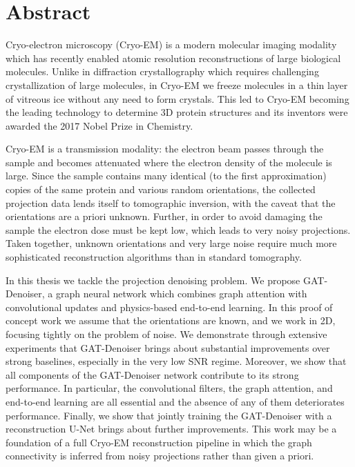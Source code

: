 \chapter{Abstract}


Cryo-electron microscopy (Cryo-EM) is a modern molecular imaging modality which has recently enabled atomic resolution reconstructions of large biological molecules. 
Unlike in diffraction crystallography which requires challenging crystallization of large molecules, 
in Cryo-EM we freeze molecules in a thin layer of vitreous ice without any need to form crystals. 
This led to Cryo-EM becoming the leading technology to determine 3D protein structures and its inventors were awarded the 2017 Nobel Prize in Chemistry.

Cryo-EM is a transmission modality: the electron beam passes through the sample and becomes attenuated where the electron density of the molecule is large. 
Since the sample contains many identical (to the first approximation) copies of the same protein and various random orientations, 
the collected projection data lends itself to tomographic inversion, with the caveat that the orientations are a priori unknown. 
Further, in order to avoid damaging the sample the electron dose must be kept low, which leads to very noisy projections. 
Taken together, unknown orientations and very large noise require much more sophisticated reconstruction algorithms than in standard tomography.

In this thesis we tackle the projection denoising problem. 
We propose GAT-Denoiser, a graph neural network which combines graph attention with convolutional updates and physics-based end-to-end learning. 
In this proof of concept work we assume that the orientations are known, and we work in 2D, focusing tightly on the problem of noise.
We demonstrate through extensive experiments that GAT-Denoiser brings about substantial improvements over strong baselines, especially in the very low SNR regime.
Moreover, we show that all components of the GAT-Denoiser network contribute to its strong performance. 
In particular, the convolutional filters, the graph attention, and end-to-end learning are all essential and the absence of any of them deteriorates performance.
Finally, we show that jointly training the GAT-Denoiser with a reconstruction U-Net brings about further improvements.
This work may be a foundation of a full Cryo-EM reconstruction pipeline in which the graph connectivity is inferred from noisy projections rather than given a priori.

